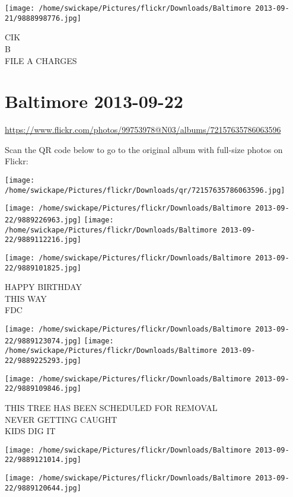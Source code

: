 \documentclass[10pt,letterpaper]{article}
\begin{document}
\vspace{0.25in}
\texttt{[image: /home/swickape/Pictures/flickr/Downloads/Baltimore 2013-09-21/9888998776.jpg]}

CIK\\
B\\
FILE A CHARGES
\pagebreak

\section*{Baltimore 2013-09-22}

\url{https://www.flickr.com/photos/99753978@N03/albums/72157635786063596}

Scan the QR code below to go to the original album with full-size photos on Flickr:

\texttt{[image: /home/swickape/Pictures/flickr/Downloads/qr/72157635786063596.jpg]}
\pagebreak

\texttt{[image: /home/swickape/Pictures/flickr/Downloads/Baltimore 2013-09-22/9889226963.jpg]}
\texttt{[image: /home/swickape/Pictures/flickr/Downloads/Baltimore 2013-09-22/9889112216.jpg]}

\vspace{0.25in}
\texttt{[image: /home/swickape/Pictures/flickr/Downloads/Baltimore 2013-09-22/9889101825.jpg]}

HAPPY BIRTHDAY\\
THIS WAY\\
FDC
\pagebreak

\texttt{[image: /home/swickape/Pictures/flickr/Downloads/Baltimore 2013-09-22/9889123074.jpg]}
\texttt{[image: /home/swickape/Pictures/flickr/Downloads/Baltimore 2013-09-22/9889225293.jpg]}

\texttt{[image: /home/swickape/Pictures/flickr/Downloads/Baltimore 2013-09-22/9889109846.jpg]}

THIS TREE HAS BEEN SCHEDULED FOR REMOVAL\\
NEVER GETTING CAUGHT\\
KIDS DIG IT
\pagebreak

\texttt{[image: /home/swickape/Pictures/flickr/Downloads/Baltimore 2013-09-22/9889121014.jpg]}

\vspace{0.25in}
\texttt{[image: /home/swickape/Pictures/flickr/Downloads/Baltimore 2013-09-22/9889120644.jpg]}
\end{document}
